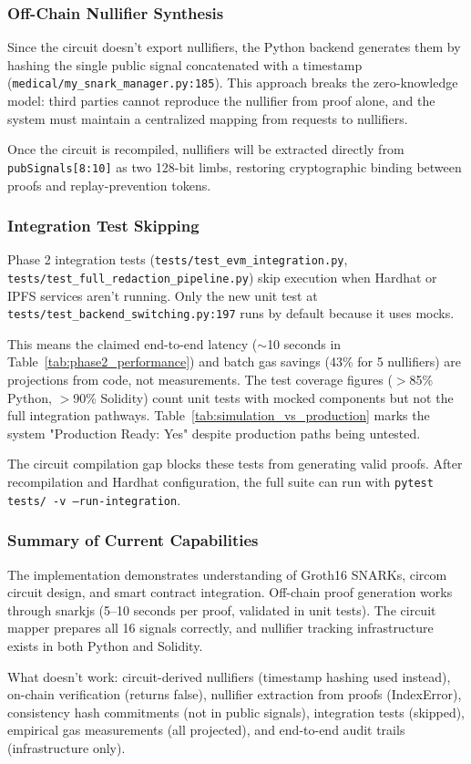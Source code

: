 \subsubsection{Off-Chain Nullifier Synthesis}

Since the circuit doesn't export nullifiers, the Python backend generates them by hashing the single public signal concatenated with a timestamp (\texttt{medical/my\_snark\_manager.py:185}). This approach breaks the zero-knowledge model: third parties cannot reproduce the nullifier from proof alone, and the system must maintain a centralized mapping from requests to nullifiers.

Once the circuit is recompiled, nullifiers will be extracted directly from \texttt{pubSignals[8:10]} as two 128-bit limbs, restoring cryptographic binding between proofs and replay-prevention tokens.

\subsubsection{Integration Test Skipping}

Phase 2 integration tests (\texttt{tests/test\_evm\_integration.py}, \texttt{tests/test\_full\_redaction\_pipeline.py}) skip execution when Hardhat or IPFS services aren't running. Only the new unit test at \texttt{tests/test\_backend\_switching.py:197} runs by default because it uses mocks.

This means the claimed end-to-end latency ($\sim$10 seconds in Table~\ref{tab:phase2_performance}) and batch gas savings (43\% for 5 nullifiers) are projections from code, not measurements. The test coverage figures ($>$85\% Python, $>$90\% Solidity) count unit tests with mocked components but not the full integration pathways. Table~\ref{tab:simulation_vs_production} marks the system "Production Ready: Yes" despite production paths being untested.

The circuit compilation gap blocks these tests from generating valid proofs. After recompilation and Hardhat configuration, the full suite can run with \texttt{pytest tests/ -v --run-integration}.

\subsubsection{Summary of Current Capabilities}

The implementation demonstrates understanding of Groth16 SNARKs, circom circuit design, and smart contract integration. Off-chain proof generation works through snarkjs (5--10 seconds per proof, validated in unit tests). The circuit mapper prepares all 16 signals correctly, and nullifier tracking infrastructure exists in both Python and Solidity.

What doesn't work: circuit-derived nullifiers (timestamp hashing used instead), on-chain verification (returns false), nullifier extraction from proofs (IndexError), consistency hash commitments (not in public signals), integration tests (skipped), empirical gas measurements (all projected), and end-to-end audit trails (infrastructure only).